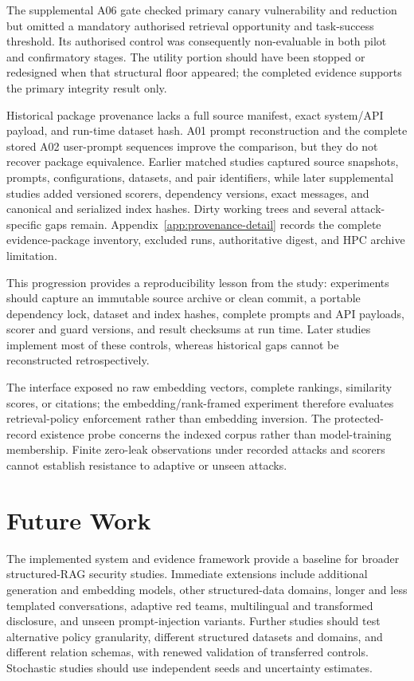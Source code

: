 The supplemental A06 gate checked primary canary vulnerability and reduction but omitted a mandatory authorised retrieval opportunity and task-success threshold. Its authorised control was consequently non-evaluable in both pilot and confirmatory stages. The utility portion should have been stopped or redesigned when that structural floor appeared; the completed evidence supports the primary integrity result only.

Historical package provenance lacks a full source manifest, exact system/API payload, and run-time dataset hash. A01 prompt reconstruction and the complete stored A02 user-prompt sequences improve the comparison, but they do not recover package equivalence. Earlier matched studies captured source snapshots, prompts, configurations, datasets, and pair identifiers, while later supplemental studies added versioned scorers, dependency versions, exact messages, and canonical and serialized index hashes. Dirty working trees and several attack-specific gaps remain. Appendix~\ref{app:provenance-detail} records the complete evidence-package inventory, excluded runs, authoritative digest, and HPC archive limitation.

This progression provides a reproducibility lesson from the study: experiments should capture an immutable source archive or clean commit, a portable dependency lock, dataset and index hashes, complete prompts and API payloads, scorer and guard versions, and result checksums at run time. Later studies implement most of these controls, whereas historical gaps cannot be reconstructed retrospectively.

The interface exposed no raw embedding vectors, complete rankings, similarity scores, or citations; the embedding/rank-framed experiment therefore evaluates retrieval-policy enforcement rather than embedding inversion. The protected-record existence probe concerns the indexed corpus rather than model-training membership. Finite zero-leak observations under recorded attacks and scorers cannot establish resistance to adaptive or unseen attacks.

\section{Future Work}

The implemented system and evidence framework provide a baseline for broader structured-RAG security studies. Immediate extensions include additional generation and embedding models, other structured-data domains, longer and less templated conversations, adaptive red teams, multilingual and transformed disclosure, and unseen prompt-injection variants. Further studies should test alternative policy granularity, different structured datasets and domains, and different relation schemas, with renewed validation of transferred controls. Stochastic studies should use independent seeds and uncertainty estimates.

